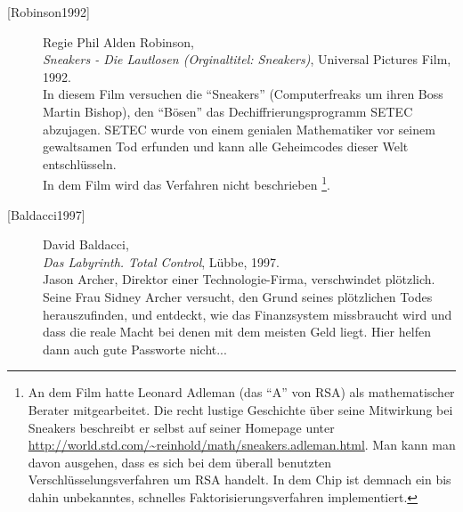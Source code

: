 \begin{refsegment}
\begin{description}
\item[\textrm{[Robinson1992]}] 
    Regie Phil Alden Robinson, \\
    {\em Sneakers - Die Lautlosen (Orginaltitel: Sneakers)},
    Universal Pictures Film, 1992. \\
    In diesem Film versuchen die "`Sneakers"' (Computerfreaks um ihren Boss
    Martin Bishop), den "`Bösen"' das Dechiffrierungsprogramm SETEC abzujagen.
    SETEC wurde von einem genialen Mathematiker vor seinem gewaltsamen Tod
    erfunden und kann alle Geheimcodes dieser Welt entschlüsseln.\\
    In dem Film wird das Verfahren nicht beschrieben%
    \footnote{
       An dem Film hatte Leonard Adleman (das "`A"' von RSA) als mathematischer
       Berater mitgearbeitet. Die recht lustige Geschichte über seine Mitwirkung
       bei Sneakers beschreibt er selbst auf seiner Homepage unter
       \url{http://world.std.com/~reinhold/math/sneakers.adleman.html}.
       Man kann man davon ausgehen, dass es sich bei dem überall benutzten
       Verschlüsselungsverfahren um RSA handelt.
       In dem Chip ist demnach ein bis dahin unbekanntes, schnelles
       Faktorisierungsverfahren implementiert.
    }.\\


\item[\textrm{[Baldacci1997]}] 
    David Baldacci, \\
    {\em Das Labyrinth. Total Control}, Lübbe, 1997. \\
    Jason Archer, Direktor einer Technologie-Firma, verschwindet plötzlich.
    Seine Frau Sidney Archer versucht, den Grund seines plötzlichen Todes
    herauszufinden, und entdeckt, wie das Finanzsystem missbraucht wird und
    dass die reale Macht bei denen mit dem meisten Geld liegt. Hier helfen
    dann auch gute Passworte nicht...\\



\end{description}
\end{refsegment}
